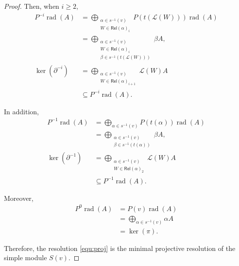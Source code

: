 \documentclass[10pt,a4paper]{amsart}
\begin{document}
\begin{proof}
	Then, when \( i \geq 2 \),
	\begin{align*}
		P^{-i}\operatorname{rad}(A) 
		&= \bigoplus_{\substack{\alpha \in s^{-1}(v) \\ W \in \mathsf{Rel}(\alpha)_i}} P(t(\mathscr{L}(W)))\operatorname{rad}(A) \\
		&= \bigoplus_{\substack{\alpha \in s^{-1}(v) \\ W \in \mathsf{Rel}(\alpha)_i \\ \beta \in s^{-1}(t(\mathscr{L}(W)))}} \beta A, \\[4pt]
		\ker(\partial^{-i}) 
		&= \bigoplus_{\substack{\alpha \in s^{-1}(v) \\ W \in \mathsf{Rel}(\alpha)_{i + 1}}} \mathscr{L}(W)A \\
		&\subseteq P^{-i}\operatorname{rad}(A).
	\end{align*}
	
	In addition,
	\begin{align*}
		P^{-1}\operatorname{rad}(A) 
		&= \bigoplus_{\alpha \in s^{-1}(v)} P(t(\alpha))\operatorname{rad}(A) \\
		&= \bigoplus_{\substack{\alpha \in s^{-1}(v) \\ \beta \in s^{-1}(t(\alpha)) }} \beta A, \\[4pt]
		\ker(\partial^{-1})
		&= \bigoplus_{\substack{\alpha \in s^{-1}(v) \\ W \in \mathsf{Rel}(\alpha)_2}} \mathscr{L}(W)A \\
		&\subseteq P^{-1}\operatorname{rad}(A).
	\end{align*}
	
	Moreover,
	\begin{align*}
		P^0\operatorname{rad}(A) 
		&= P(v)\operatorname{rad}(A) \\
		&= \bigoplus_{\alpha \in s^{-1}(v)} \alpha A \\
		&= \ker(\pi).
	\end{align*}
	
	Therefore, the resolution \ref{equ:proj} is the minimal projective resolution of the simple module \( S(v) \).
	
	
\end{proof}
\end{document}
